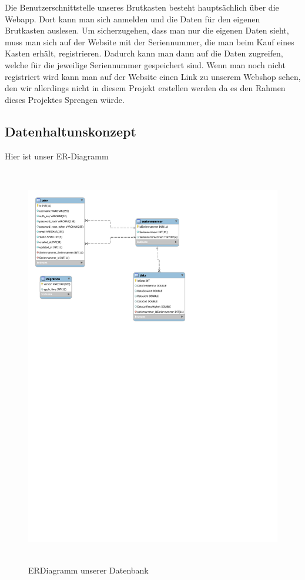 Die Benutzerschnittstelle unseres Brutkasten besteht hauptsächlich über die Webapp. Dort kann man sich anmelden und die Daten für den eigenen Brutkasten auslesen. Um sicherzugehen, dass man nur die eigenen Daten sieht, muss man sich auf der Website mit der Seriennummer, die man beim Kauf eines Kasten erhält, registrieren. Dadurch kann man dann auf die Daten zugreifen, welche für die jeweilige Seriennummer gespeichert sind.
\newline
Wenn man noch nicht registriert wird kann man auf der Website einen Link zu unserem Webshop sehen, den wir allerdings nicht in diesem Projekt erstellen werden da es den Rahmen dieses Projektes Sprengen würde.
\newpage
\subsection{Datenhaltunskonzept}
Hier ist unser ER-Diagramm
	\begin{figure}[H]
	\includegraphics[height=500pt]{figures/ERDiagramm}
	\caption{ERDiagramm unserer Datenbank}
	\end{figure}
	
